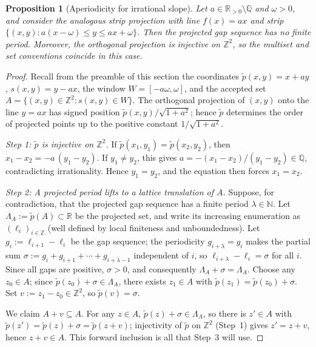 \documentclass[11pt,reqno]{amsart}
\theoremstyle{plain}
\newtheorem{proposition}[theorem]{Proposition}
\theoremstyle{definition}
\theoremstyle{remark}
\begin{document}
\begin{proposition}[Aperiodicity for irrational slope]\label{prop:irrational}
Let \(a \in \mathbb{R}_{>0} \setminus \mathbb{Q}\) and \(\omega > 0\), and
consider the analogous strip projection with line \(f(x) = a x\) and strip
\(\{(x,y) : a(x-\omega) \le y \le a x + \omega\}\).  Then the projected
gap sequence has \emph{no} finite period.  Moreover, the orthogonal
projection is injective on \(\mathbb{Z}^2\), so the multiset and set
conventions coincide in this case.
\end{proposition}

\begin{proof}
Recall from the preamble of this section the coordinates
\(\tilde p(x, y) = x + a y\), \(s(x, y) = y - a x\), the window
\(W = [-a\omega,\omega]\), and the accepted set
\(A = \{(x, y) \in \mathbb{Z}^2 : s(x, y) \in W\}\).
The orthogonal projection of \((x, y)\) onto the line \(y = a x\) has
signed position \(\tilde p(x, y)/\sqrt{1 + a^2}\); hence \(\tilde p\)
determines the order of projected points up to the positive constant
\(1/\sqrt{1 + a^2}\).

\emph{Step 1: \(\tilde p\) is injective on \(\mathbb{Z}^2\).}\quad
If \(\tilde p(x_1, y_1) = \tilde p(x_2, y_2)\), then
\(x_1 - x_2 = -a\,(y_1 - y_2)\).  If \(y_1 \ne y_2\), this gives
\(a = -(x_1 - x_2)/(y_1 - y_2) \in \mathbb{Q}\), contradicting
irrationality.  Hence \(y_1 = y_2\), and the equation then forces
\(x_1 = x_2\).

\emph{Step 2: A projected period lifts to a lattice translation of
\(A\).}\quad
Suppose, for contradiction, that the projected gap sequence has a finite
period \(\lambda \in \mathbb{N}\).  Let \(\Lambda_A := \tilde p(A) \subset
\mathbb{R}\) be the projected set, and write its increasing enumeration
as \((\ell_i)_{i \in \mathbb{Z}}\) (well defined by local finiteness and
unboundedness).  Let \(g_i := \ell_{i+1} - \ell_i\) be the gap sequence;
the periodicity \(g_{i+\lambda} = g_i\) makes the partial sum
\(\sigma := g_i + g_{i+1} + \cdots + g_{i+\lambda - 1}\) independent of
\(i\), so \(\ell_{i+\lambda} - \ell_i = \sigma\) for all \(i\).  Since all
gaps are positive, \(\sigma > 0\), and consequently
\(\Lambda_A + \sigma = \Lambda_A\).
Choose any \(z_0 \in A\); since \(\tilde p(z_0) + \sigma \in \Lambda_A\),
there exists \(z_1 \in A\) with
\(\tilde p(z_1) = \tilde p(z_0) + \sigma\).  Set
\(v := z_1 - z_0 \in \mathbb{Z}^2\), so \(\tilde p(v) = \sigma\).

We claim \(A + v \subseteq A\).  For any \(z \in A\),
\(\tilde p(z) + \sigma \in \Lambda_A\), so there is \(z' \in A\) with
\(\tilde p(z') = \tilde p(z) + \sigma = \tilde p(z + v)\); injectivity of
\(\tilde p\) on \(\mathbb{Z}^2\) (Step~1) gives \(z' = z + v\), hence
\(z + v \in A\).  This forward inclusion is all that Step~3 will use.


\end{proof}
\end{document}
